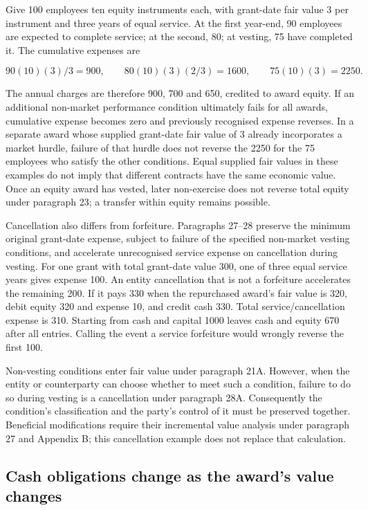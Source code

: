 Give 100 employees ten equity instruments each, with grant-date fair value 3 per instrument and three years of equal service. At the first year-end, 90 employees are expected to complete service; at the second, 80; at vesting, 75 have completed it. The cumulative expenses are

\[90(10)(3)/3=900,\qquad 80(10)(3)(2/3)=1600,\qquad75(10)(3)=2250.\]

The annual charges are therefore 900, 700 and 650, credited to award equity. If an additional non-market performance condition ultimately fails for all awards, cumulative expense becomes zero and previously recognised expense reverses. In a separate award whose supplied grant-date fair value of 3 already incorporates a market hurdle, failure of that hurdle does not reverse the 2250 for the 75 employees who satisfy the other conditions. Equal supplied fair values in these examples do not imply that different contracts have the same economic value. Once an equity award has vested, later non-exercise does not reverse total equity under paragraph 23; a transfer within equity remains possible.

Cancellation also differs from forfeiture. Paragraphs 27--28 \citep[IFRS~2.27--28A]{eu20231803} preserve the minimum original grant-date expense, subject to failure of the specified non-market vesting conditions, and accelerate unrecognised service expense on cancellation during vesting. For one grant with total grant-date value 300, one of three equal service years gives expense 100. An entity cancellation that is not a forfeiture accelerates the remaining 200. If it pays 330 when the repurchased award's fair value is 320, debit equity 320 and expense 10, and credit cash 330. Total service/cancellation expense is 310. Starting from cash and capital 1000 leaves cash and equity 670 after all entries. Calling the event a service forfeiture would wrongly reverse the first 100.

Non-vesting conditions enter fair value under paragraph 21A. However, when the entity or counterparty can choose whether to meet such a condition, failure to do so during vesting is a cancellation under paragraph 28A. Consequently the condition's classification and the party's control of it must be preserved together. Beneficial modifications require their incremental value analysis under paragraph 27 and Appendix B; this cancellation example does not replace that calculation.

\hypertarget{cash-obligations-change-as-the-awards-value-changes}{%
\subsection{Cash obligations change as the award's value changes}\label{cash-obligations-change-as-the-awards-value-changes}}

